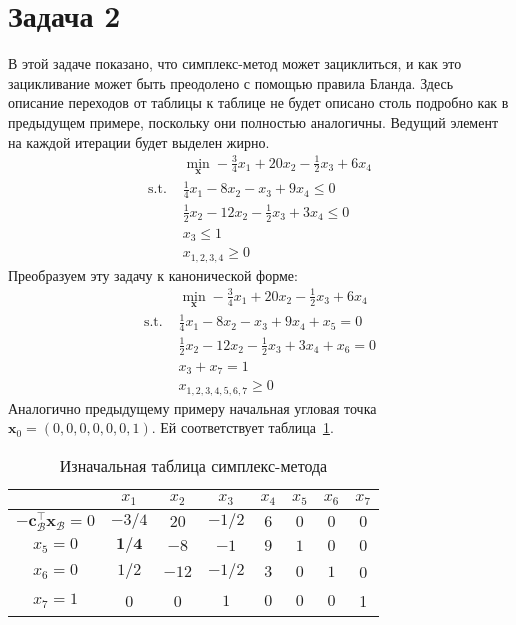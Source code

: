 \documentclass[12pt]{article}
\newcommand{\bx}{\mathbf{x}}
\begin{document}
\section{Задача 2}
В этой задаче показано, что симплекс-метод может зациклиться, и как это зацикливание может быть преодолено с помощью правила Бланда. 
Здесь описание переходов от таблицы к таблице не будет описано столь подробно как в предыдущем примере, поскольку они полностью аналогичны. 
Ведущий элемент на каждой итерации будет выделен жирно.
\begin{equation*}
\begin{split}
& \min_{\bx} -\frac{3}{4}x_1 + 20x_2 - \frac{1}{2}x_3 + 6x_4\\
\text{s.t. } & \frac{1}{4}x_1 - 8x_2 - x_3 + 9x_4 \leq 0\\
& \frac{1}{2}x_2 - 12x_2 - \frac{1}{2}x_3 + 3x_4 \leq 0\\
& x_3 \leq 1\\
& x_{1,2,3,4} \geq 0
\end{split}
\end{equation*}
Преобразуем эту задачу к канонической форме:
\begin{equation*}
\begin{split}
& \min_{\bx} -\frac{3}{4}x_1 + 20x_2 - \frac{1}{2}x_3 + 6x_4\\
\text{s.t. } & \frac{1}{4}x_1 - 8x_2 - x_3 + 9x_4 + x_5 = 0\\
& \frac{1}{2}x_2 - 12x_2 - \frac{1}{2}x_3 + 3x_4 + x_6 = 0\\
& x_3 + x_7 = 1\\
& x_{1,2,3,4,5,6,7} \geq 0
\end{split}
\end{equation*}
Аналогично предыдущему примеру начальная угловая точка $\bx_0 = (0,0,0,0, 0,0,1)$.
Ей соответствует таблица~\ref{tab::simplex_20}.

\begin{table}[!ht]
\centering
\caption{Изначальная таблица симплекс-метода}
\begin{tabular}{|c|ccccccc|}
\hline
& $x_1$ & $x_2$ & $x_3$ & $x_4$ & $x_5$ & $x_6$ & $x_7$\\
\hline
$-\mathbf{c}_{\mathcal{B}}^{\top}\bx_{\mathcal{B}} = 0$ & $-3/4$ & $20$ & $-1/2$ & $6$ & $0$ & $0$ & $0$ \\
\hline
$x_5 = 0$ & $\mathbf{1/4}$ & $-8$ & $-1$ & $9$ & $1$ & $0$ & $0$ \\
$x_6 = 0$ & $1/2$ & $-12$ & $-1/2$ & $3$ & $0$ & $1$ & 0 \\
$x_7 = 1$ & 0 & 0 & $1$ & $0$ & $0$ & $0$ & 1 \\
\hline
\end{tabular}
\label{tab::simplex_20}
\end{table}
\end{document}
